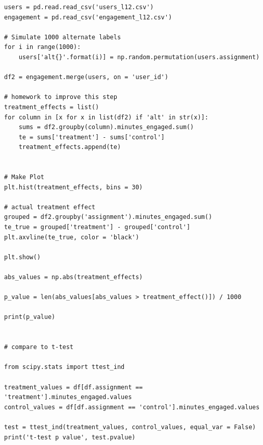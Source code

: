 \begin{lstlisting}
users = pd.read.read_csv('users_l12.csv')
engagement = pd.read_csv('engagement_l12.csv')

# Simulate 1000 alternate labels
for i in range(1000):
    users['alt{}'.format(i)] = np.random.permutation(users.assignment)
    
df2 = engagement.merge(users, on = 'user_id')

# homework to improve this step
treatment_effects = list()
for column in [x for x in list(df2) if 'alt' in str(x)]:
    sums = df2.groupby(column).minutes_engaged.sum()
    te = sums['treatment'] - sums['control']
    treatment_effects.append(te)


# Make Plot
plt.hist(treatment_effects, bins = 30)

# actual treatment effect
grouped = df2.groupby('assignment').minutes_engaged.sum()
te_true = grouped['treatment'] - grouped['control']
plt.axvline(te_true, color = 'black')

plt.show()

abs_values = np.abs(treatment_effects)

p_value = len(abs_values[abs_values > treatment_effect()]) / 1000

print(p_value)


# compare to t-test

from scipy.stats import ttest_ind

treatment_values = df[df.assignment == 'treatment'].minutes_engaged.values
control_values = df[df.assignment == 'control'].minutes_engaged.values

test = ttest_ind(treatment_values, control_values, equal_var = False)
print('t-test p value', test.pvalue)
\end{lstlisting}